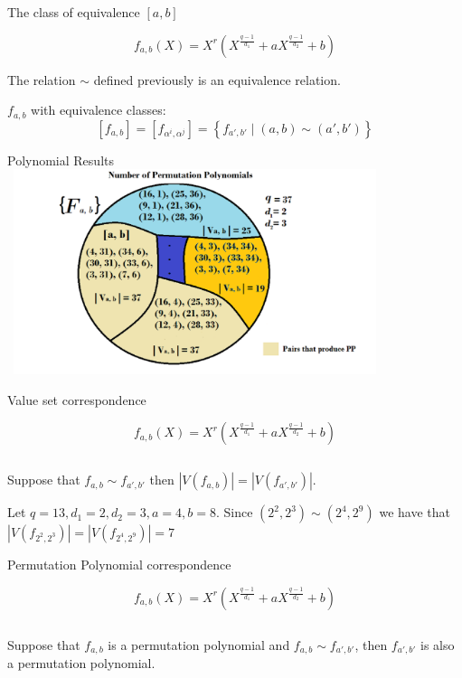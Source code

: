 \documentclass{beamer}
\begin{document}
\begin{frame}{The class of equivalence $[a,b]$}

  {\Large $$f_{a,b}(X) = X^r(X^{\frac{q-1}{d_1}} + aX^{\frac{q-1}{d_2}} +b)$$}
  \begin{lemma}
    The relation $\sim$ defined previously is an equivalence relation.
  \end{lemma}

  {\Large $f_{a,b}$ with equivalence classes:
  $$ [f_{a,b}] = [f_{\alpha^i, \alpha^j}] = \left\{ f_{a',b'} \mid (a,b) \sim (a',b') \right\} $$}

\end{frame}

\begin{frame}{Polynomial Results}
  \includegraphics[width=11cm, height=6cm]{clases1}
\end{frame}

\begin{frame}{Value set correspondence}

  {\Large $$f_{a,b}(X) = X^r(X^{\frac{q-1}{d_1}} + aX^{\frac{q-1}{d_2}} +b)$$}

  $$$$

  \begin{theorem}

    Suppose that $f_{a, b} \sim f_{a',b'}$ then $|V(f_{a, b})| = |V(f_{a', b'})|$.

  \end{theorem}

  \begin{example}
    Let $q = 13, d_1 = 2, d_2 = 3, a = 4, b = 8$. Since $(2^2,2^3) \sim (2^4,2^9)$ we have that $|V(f_{2^2, 2^3})| = |V(f_{2^4, 2^9})| = 7$
  \end{example}

\end{frame}

\begin{frame}{Permutation Polynomial correspondence}

  {\Large $$f_{a,b}(X) = X^r(X^{\frac{q-1}{d_1}} + aX^{\frac{q-1}{d_2}} +b)$$}

  $$$$

  \begin{corollary}
    Suppose that $f_{a,b}$ is a permutation polynomial and $f_{a, b} \sim f_{a',b'}$, then $f_{a', b'}$ is also a permutation polynomial.
  \end{corollary}
\end{frame}
\end{document}
